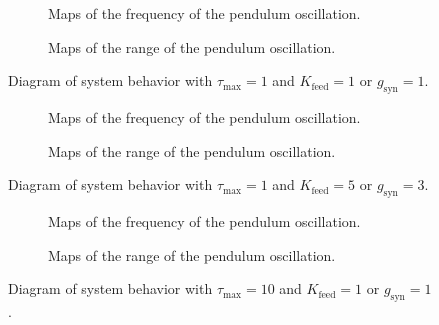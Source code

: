 \begin{figure}[!htb]
    \centering
    \begin{subfigure}[t][.46\textheight][b]{\textwidth}
        \centering
        \caption{Maps of the frequency of the pendulum oscillation.}
        \label{fig:double_t1_low_freq}
    \end{subfigure}
    
    \begin{subfigure}[b][.46\textheight][t]{\textwidth}
        \centering
        \caption{Maps of the range of the pendulum oscillation.}
        \label{fig:double_t1_low_range}
    \end{subfigure}
    \caption{Diagram of system behavior with $\tau_\text{max}=1$ and $K_\text{feed} = 1$ or $g_{\text{syn}} = 1$.}
    \label{fig:double_t1_low}
\end{figure}

\begin{figure}[!htb]
    \centering
    \begin{subfigure}[t][.46\textheight][b]{\textwidth}
        \centering
        \caption{Maps of the frequency of the pendulum oscillation.}
        \label{fig:double_t1_high_freq}  
    \end{subfigure}
    
    \begin{subfigure}[b][.46\textheight][t]{\textwidth}
        \centering
        \caption{Maps of the range of the pendulum oscillation.}
        \label{fig:double_t1_high_range}  
    \end{subfigure}
    \caption{Diagram of system behavior with $\tau_\text{max}=1$ and $K_\text{feed} = 5$ or $g_{\text{syn}} = 3$.}
    \label{fig:double_t1_high}
\end{figure}

\begin{figure}[!htb]
    \centering
    \begin{subfigure}[t][.46\textheight][b]{\textwidth}
        \centering
        \caption{Maps of the frequency of the pendulum oscillation.}
        \label{fig:double_t10_low_freq}
    \end{subfigure}
    
    \begin{subfigure}[b][.46\textheight][t]{\textwidth}
        \centering
        \caption{Maps of the range of the pendulum oscillation.}
        \label{fig:double_t10_low_range}
    \end{subfigure}
    \caption{Diagram of system behavior with $\tau_\text{max}=10$ and $K_\text{feed} = 1$ or $g_{\text{syn}} = 1$.}
    \label{fig:double_t10_low}
\end{figure}

